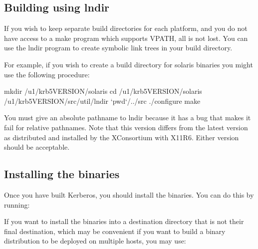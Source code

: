 \documentclass[letterpaper,10pt,english]{sphinxmanual}
\begin{document}
\begin{sphinxVerbatim}[commandchars=\\\{\}]
 
 
\end{sphinxVerbatim}


\subsection{Building using lndir}
\label{\detokenize{build/doing_build:building-using-lndir}}
\sphinxAtStartPar
If you wish to keep separate build directories for each platform, and
you do not have access to a make program which supports VPATH, all is
not lost.  You can use the lndir program to create symbolic link trees
in your build directory.

\sphinxAtStartPar
For example, if you wish to create a build directory for solaris
binaries you might use the following procedure:

\begin{sphinxVerbatim}[commandchars=\\\{\}]
mkdir /u1/krb5\PYGZhy{}VERSION/solaris
cd /u1/krb5\PYGZhy{}VERSION/solaris
/u1/krb5\PYGZhy{}VERSION/src/util/lndir `pwd`/../src
./configure
make
\end{sphinxVerbatim}

\sphinxAtStartPar
You must give an absolute pathname to lndir because it has a bug that
makes it fail for relative pathnames.  Note that this version differs
from the latest version as distributed and installed by the
XConsortium with X11R6.  Either version should be acceptable.


\subsection{Installing the binaries}
\label{\detokenize{build/doing_build:installing-the-binaries}}
\sphinxAtStartPar
Once you have built Kerberos, you should install the binaries. You can
do this by running:

\begin{sphinxVerbatim}[commandchars=\\\{\}]
 
\end{sphinxVerbatim}

\sphinxAtStartPar
If you want to install the binaries into a destination directory that
is not their final destination, which may be convenient if you want to
build a binary distribution to be deployed on multiple hosts, you may
use:
\end{document}
